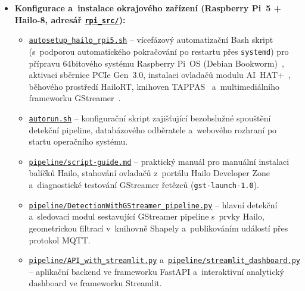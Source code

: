 \begin{itemize}
    \item \textbf{Konfigurace a~instalace okrajového zařízení (Raspberry Pi~5 + Hailo-8, adresář \href{https://github.com/imang212/Bachelor_Thesis/tree/main/rpi_src}{\texttt{rpi\_src/}}):}
    \begin{itemize}
        \item \href{https://github.com/imang212/Bachelor_Thesis/blob/main/rpi_src/autosetup_hailo_rpi5.sh}{\texttt{autosetup\_hailo\_rpi5.sh}} – vícefázový automatizační Bash skript (s~podporou automatického pokračování po restartu přes \texttt{systemd}) pro přípravu 64bitového systému Raspberry Pi~OS (Debian Bookworm)~\cite{raspberrypi_docs_2024}, aktivaci sběrnice \acs{PCIe} Gen~3.0, instalaci ovladačů modulu AI~HAT+~\cite{raspberrypi_ai_kit}, běhového prostředí HailoRT, knihoven TAPPAS~\cite{tappas_user_guide_331} a~multimediálního frameworku GStreamer~\cite{gstreamer_docs}.
        \item \href{https://github.com/imang212/Bachelor_Thesis/blob/main/rpi_src/autorun.sh}{\texttt{autorun.sh}} – konfigurační skript zajišťující bezobslužné spouštění detekční pipeline, databázového odběratele a~webového rozhraní po startu operačního systému.
        \item \href{https://github.com/imang212/Bachelor_Thesis/blob/main/rpi_src/pipeline/script-guide.md}{\texttt{pipeline/script-guide.md}} – praktický manuál pro manuální instalaci balíčků Hailo, stahování ovladačů z~portálu Hailo Developer Zone a~diagnostické testování GStreamer řetězců (\texttt{gst-launch-1.0}).
        \item \href{https://github.com/imang212/Bachelor_Thesis/blob/main/rpi_src/pipeline/DetectionWithGStreamer_pipeline.py}{\texttt{pipeline/DetectionWithGStreamer\_pipeline.py}} – hlavní detekční a~sledovací modul sestavující GStreamer pipeline s~prvky Hailo, geometrickou filtrací v~knihovně Shapely a~publikováním událostí přes protokol \acs{MQTT}.
        \item \href{https://github.com/imang212/Bachelor_Thesis/blob/main/rpi_src/pipeline/API_with_streamlit.py}{\texttt{pipeline/API\_with\_streamlit.py}} a~\href{https://github.com/imang212/Bachelor_Thesis/blob/main/rpi_src/pipeline/streamlit_dashboard.py}{\texttt{pipeline/streamlit\_dashboard.py}} – aplikační backend ve frameworku FastAPI a~interaktivní analytický dashboard ve frameworku Streamlit.
    \end{itemize}


\end{itemize}
